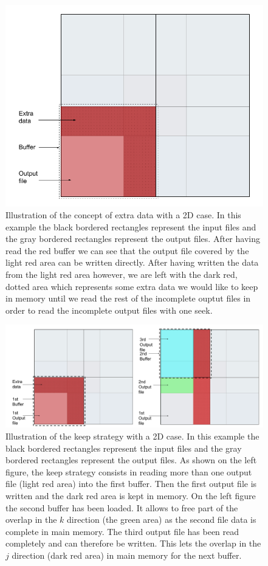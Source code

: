 \documentclass[conference]{IEEEtran}
\begin{document}
\begin{figure}[h]
\centering
\includegraphics[scale=0.2]{./figures/overlap.png}
\caption{Illustration of the concept of extra data with a 2D case. In this example the black bordered rectangles represent the input files and the gray bordered rectangles represent the output files. After having read the red buffer we can see that the output file covered by the light red area can be written directly. After having written the data from the light red area however, we are left with the dark red, dotted area which represents some extra data we would like to keep in memory until we read the rest of the incomplete ouptut files in order to read the incomplete output files with one seek.
}
\label{fig:overlap}
\end{figure}

\begin{figure}[h]
\centering
\includegraphics[scale=0.2]{./figures/keep_strategy.png}
\caption{Illustration of the keep strategy with a 2D case. In this example the black bordered rectangles represent the input files and the gray bordered rectangles represent the output files. As shown on the left figure, the keep strategy consists in reading more than one output file (light red area) into the first buffer. Then the first output file is written and the dark red area is kept in memory. On the left figure the second buffer has been loaded. It allows to free part of the overlap in the $k$ direction (the green area) as the second file data is complete in main memory. The third output file has been read completely and can therefore be written. This lets the overlap in the $j$ direction (dark red area) in main memory for the next buffer.
}
\label{fig:keepstrategy}
\end{figure}
\end{document}
